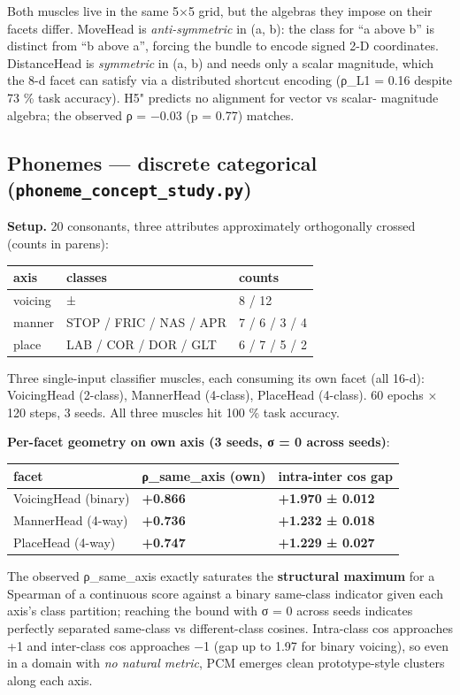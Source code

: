 Both muscles live in the same 5×5 grid, but the algebras they impose
on their facets differ. MoveHead is \emph{anti-symmetric} in (a, b): the
class for ``a above b'' is distinct from ``b above a'', forcing the
bundle to encode signed 2-D coordinates. DistanceHead is \emph{symmetric}
in (a, b) and needs only a scalar magnitude, which the 8-d facet can
satisfy via a distributed shortcut encoding (ρ\_L1 = 0.16 despite 73 \%
task accuracy). H5" predicts no alignment for vector vs scalar-
magnitude algebra; the observed ρ = −0.03 (p = 0.77) matches.

\subsection{\texorpdfstring{Phonemes --- discrete categorical (\texttt{phoneme\_concept\_study.py})}{Phonemes --- discrete categorical (phoneme\_concept\_study.py)}}

\textbf{Setup.} 20 consonants, three attributes approximately orthogonally
crossed (counts in parens):

\begin{longtable}[]{@{}lll@{}}
\toprule
axis & classes & counts\tabularnewline
\midrule
\endhead
voicing & ± & 8 / 12\tabularnewline
manner & STOP / FRIC / NAS / APR & 7 / 6 / 3 / 4\tabularnewline
place & LAB / COR / DOR / GLT & 6 / 7 / 5 / 2\tabularnewline
\bottomrule
\end{longtable}

Three single-input classifier muscles, each consuming its own facet
(all 16-d): VoicingHead (2-class), MannerHead (4-class), PlaceHead
(4-class). 60 epochs × 120 steps, 3 seeds. All three muscles hit
100 \% task accuracy.

\textbf{Per-facet geometry on own axis (3 seeds, σ = 0 across seeds)}:

\begin{longtable}[]{@{}lll@{}}
\toprule
facet & ρ\_same\_axis (own) & intra-inter cos gap\tabularnewline
\midrule
\endhead
VoicingHead (binary) & \textbf{+0.866} & \textbf{+1.970 ± 0.012}\tabularnewline
MannerHead (4-way) & \textbf{+0.736} & \textbf{+1.232 ± 0.018}\tabularnewline
PlaceHead (4-way) & \textbf{+0.747} & \textbf{+1.229 ± 0.027}\tabularnewline
\bottomrule
\end{longtable}

The observed ρ\_same\_axis exactly saturates the \textbf{structural maximum}
for a Spearman of a continuous score against a binary same-class
indicator given each axis's class partition; reaching the bound with
σ = 0 across seeds indicates perfectly separated same-class vs
different-class cosines. Intra-class cos approaches +1 and
inter-class cos approaches −1 (gap up to 1.97 for binary voicing),
so even in a domain with \emph{no natural metric}, PCM emerges clean
prototype-style clusters along each axis.

